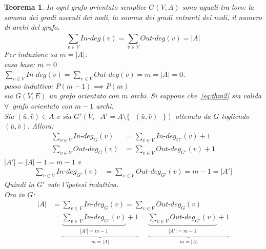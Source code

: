 \documentclass[a4paper, oneside, openany]{book}
\theoremstyle{plain}
\newtheorem{thm}{Teorema}[section]
\theoremstyle{definition}
\begin{document}
\begin{thm}
In ogni grafo orientato semplice $G(V,A)$ sono uguali tra loro: la somma dei gradi
uscenti dei nodi, la somma dei gradi entranti dei nodi, il numero di archi del grafo.
\begin{equation}
{\sum_{v \in V}^{} In\text{-}deg(v)} = {\sum_{v \in V}^{} Out\text{-}deg(v)} = |A|
\label{eq:thm2}
\end{equation}
\proof
    Per induzione su $m = |A|$:\\
    \emph{caso base: $m = 0$}\\ 
    \indent $\sum_{v \in V}^{} In\text{-}deg(v) = \sum_{v \in V}^{} Out\text{-}deg(v) =
    m = |A| = 0$.\\
    \emph{passo induttivo:} $P(m-1) \implies P(m)$\\
    \indent sia $G(V,E)$ un grafo orientato con $m$ archi. Si suppone che~\ref{eq:thm2} 
    sia valida $\forall$~grafo orientato con $m-1$ archi.\\
    Sia $(\bar{u}, \bar{v}) \in A$ e sia 
    $G'(V, \text{ } A'=A \setminus \{\text{ } (\bar{u}, \bar{v}) \text{ }\})$ 
    ottenuto da $G$ togliendo $(\bar{u}, \bar{v})$. Allora:
    \begin{align*}
        \sum_{v \in V}^{} {In\text{-}deg_{G}(v)} & = \sum_{v \in V}^{} {In\text{-}deg_{G'}(v)} + 1\\
        \sum_{v \in V}^{} Out\text{-}deg_{G}(v) & = \sum_{v \in V}^{} Out\text{-}deg_{G'}(v) + 1
    \end{align*}
    $|A'| = |A| - 1 = m - 1$ e
    \begin{align*}
        \sum_{v \in V}^{} {In\text{-}deg_{G'}(v)} & = \sum_{v \in V}^{} {Out\text{-}deg_{G'}(v)} = 
        m - 1 = |A'|
    \end{align*}
    Quindi in $G'$ vale l'ipotesi induttiva.\\Ora in $G$:
    \begin{equation*}
    \begin{split}
        |A| & = \sum_{v \in V}^{} {In\text{-}deg_{G}(v)} = \sum_{v \in V}^{} {Out\text{-}deg_{G}(v)}\\
    & =\underbrace{\underbrace{\sum_{v \in V}^{} {In\text{-}deg_{G'}(v)}}_{|A'| = m-1}+1}_{m=|A|} =
        \underbrace{\underbrace{\sum_{v \in V}^{} {Out\text{-}deg_{G'}(v)}}_{|A'| = m-1}+1}_{m=|A|}
    \end{split}
    \end{equation*}
\endproof
\end{thm}
\end{document}

